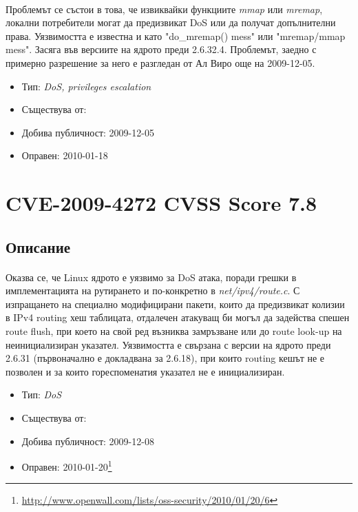 \documentclass[a4paper,12pt,leqno]{article}
\begin{document}
\paragraph{}
Проблемът се състои в това, че извиквайки функциите \textit{mmap} или \textit{mremap}, 
локални потребители могат да предизвикат DoS или да получат 
допълнителни права. Уязвимостта е известна и като "do\_mremap() mess" или 
"mremap/mmap mess". Засяга във версиите на ядрото преди 2.6.32.4. 
Проблемът, заедно с примерно разрешение за него е разгледан от Ал Виро 
още на 2009-12-05.

\begin{itemize}
    \item Тип: \textit{DoS, privileges escalation}
    \item Съществува от:
  	\item Добива публичност: 2009-12-05
    \item Оправен: 2010-01-18
\end{itemize}


\section{CVE-2009-4272 CVSS Score 7.8}
\subsection{Описание}
\paragraph{}
Оказва се, че Linux ядрото е уязвимо за DoS атака, поради грешки в 
имплементацията на рутирането и по-конкретно в \textit{net/ipv4/route.c}. С 
изпращането на специално модифицирани пакети, които да предизвикат колизии в IPv4 routing хеш таблицата, отдалечен атакуващ би могъл да 
задейства спешен route flush, при което на свой ред възниква замръзване или 
до route look-up на неинициализиран указател. Уязвимостта е свързана с 
версии на ядрото преди 2.6.31 (първоначално е докладвана за 2.6.18), при 
които routing кешът не е позволен и за които гореспоменатия указател не е 
инициализиран.

\begin{itemize}
    \item Тип: \textit{DoS}
    \item Съществува от:
  	\item Добива публичност: 2009-12-08
    \item Оправен: 2010-01-20\footnote{\url{http://www.openwall.com/lists/oss-security/2010/01/20/6}}
\end{itemize}
\end{document}
